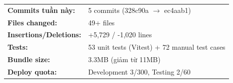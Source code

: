 \documentclass{article}
\begin{document}
\begin{tabularx}{\textwidth}{@{}l X@{}}
\textbf{Commits tuần này:} & 5 commits (328c90a $\rightarrow$ ec4aab1) \\
\textbf{Files changed:} & 49+ files \\
\textbf{Insertions/Deletions:} & +5,729 / -1,020 lines \\
\textbf{Tests:} & 53 unit tests (Vitest) + 72 manual test cases \\
\textbf{Bundle size:} & 3.3MB (giảm từ 11MB) \\
\textbf{Deploy quota:} & Development 3/300, Testing 2/60 \\
\end{tabularx}
\end{document}
